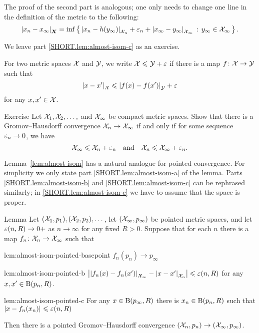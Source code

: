 The proof of the second part is analogous; one only needs to change one line in the definition of the metric to the following:
\[|{x_n}-{x_\infty}|_{\bm{X}}^{{}}=\inf\left\{\,{|{x_n}-{h(y_\infty)}|_{\mathcal{X}_n}^{{}}+\varepsilon_n+|{x_\infty}-{y_\infty}|_{\mathcal{X}_\infty}^{{}}}\,:\,{{y_\infty}\in \mathcal{X}_\infty}\,\right\}.\]

We leave part \ref{SHORT.lem:almost-isom-c} as an exercise.
\qedsf

For two metric spaces $\mathcal{X}$ and $\mathcal{Y}$,
we write $\mathcal{X}\leqslant \mathcal{Y}+\varepsilon$ if
there is a map $f\colon\mathcal{X}\to \mathcal{Y}$ such that
\[|{x}-{x'}|_{\mathcal{X}}^{{}}\leqslant |{f(x)}-{f(x')}|_{\mathcal{Y}}^{{}}+\varepsilon\]
for any $x,x'\in \mathcal{X}$.

\begin{thm}{Exercise}\label{ex:GH-po}
Let $\mathcal{X}_1,\mathcal{X}_2,\dots,$ and $\mathcal{X}_\infty$ be compact metric spaces.
Show that there is a Gromov--Hausdorff convergence $\mathcal{X}_n\to\mathcal{X}_\infty$ if and only if for some sequence $\varepsilon_n\to 0$,
we have
\[\mathcal{X}_\infty\leqslant \mathcal{X}_n+\varepsilon_n\quad\text{and}\quad \mathcal{X}_n\leqslant \mathcal{X}_\infty+\varepsilon_n.\]
\end{thm}

Lemma~\ref{lem:almost-isom} has a natural analogue for pointed convergence.
For simplicity we only state part \ref{SHORT.lem:almost-isom-a} of the lemma.
Parts \ref{SHORT.lem:almost-isom-b} and \ref{SHORT.lem:almost-isom-c} can be rephrased similarly;
in \ref{SHORT.lem:almost-isom-c} we have to assume that the space is proper.

\begin{thm}{Lemma}\label{lem:almost-isom-pointed}
Let $(\mathcal{X}_1, p_1),(\mathcal{X}_2,p_2) ,\dots$, let $(\mathcal{X}_\infty, p_\infty)$ be pointed metric spaces, and let $\varepsilon(n,R)\to0+$ as $n\to\infty$ for any fixed $R>0$.
Suppose that for each $n$ there is a map $f_n\colon\mathcal{X}_n\to\mathcal{X}_\infty$ such that


\begin{subthm}{lem:almost-isom-pointed-basepoint}
$f_n(p_n)\to p_\infty$
\end{subthm}

\begin{subthm}{lem:almost-isom-pointed-b}
$\bigl||{f_n(x)}-{f_n(x')}|_{\mathcal{X}_\infty }^{{}}-|{x}-{x'}|_{\mathcal{X}_n}^{{}}\bigr|\leqslant \varepsilon(n,R)$ for any $x,x'\in \mathrm{B}{}(p_n,R)$.
\end{subthm}

\begin{subthm}{lem:almost-isom-pointed-c}
For any $x \in \mathrm{B}{}(p_\infty,R)$ there is $x_n\in \mathrm{B}{}(p_n,R)$ such that $|{x}-{f_n(x_n)}|_{}^{{}}\leqslant \varepsilon(n,R)$
\end{subthm}

Then there is a pointed  Gromov--Hausdorff convergence $(\mathcal{X}_n,p_n)\to (\mathcal{X}_\infty,p_\infty)$.
\end{thm}

